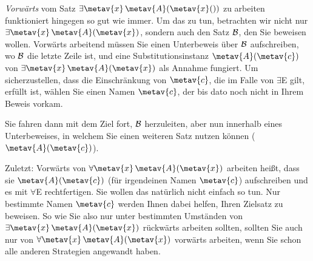 \emph{Vorwärts} vom Satz $\exists \metav{x}\, \atom{\metav{A}(\metav{x}})$ zu arbeiten funktioniert hingegen so gut wie immer. Um das zu tun, betrachten wir nicht nur $\exists \metav{x}\, \atom{\metav{A}}{\metav{x}}$, sondern auch den Satz $\mathcal{B}$, den Sie beweisen wollen. Vorwärts arbeitend müssen Sie einen Unterbeweis über $\mathcal{B}$ aufschreiben, wo $\mathcal{B}$ die letzte Zeile ist, und eine Substitutionsinstanz $\atom{\metav{A}}{\metav{c}}$ von $\exists \metav{x}\, \atom{\metav{A}}{\metav{x}}$ als Annahme fungiert. Um sicherzustellen, dass die Einschränkung von $\metav{c}$, die im Falle von $\exists$E gilt, erfüllt ist, wählen Sie einen Namen $\metav{c}$, der bis dato noch nicht in Ihrem Beweis vorkam. 
\begin{fitchproof}
	\ellipsesline
	\ellipsesline
	\open
	\ellipsesline
	\close
\end{fitchproof}
Sie fahren dann mit dem Ziel fort, $\mathcal{B}$ herzuleiten, aber nun innerhalb eines Unterbeweises, in welchem Sie einen weiteren Satz nutzen können ($\atom{\metav{A}}{\metav{c}}$).

Zuletzt: Vorwärts von $\forall \metav{x}\, \atom{\metav{A}}{\metav{x}}$ arbeiten hei{\ss}t, dass sie $\atom{\metav{A}}{\metav{c}}$ (für irgendeinen Namen $\metav{c}$) aufschreiben und es mit $\forall$E rechtfertigen. Sie wollen das natürlich nicht einfach so tun. Nur bestimmte Namen $\metav{c}$ werden Ihnen dabei helfen, Ihren Zielsatz zu beweisen. So wie Sie also nur unter bestimmten Umständen von $\exists \metav{x}\, \atom{\metav{A}}{\metav{x}}$ rückwärts arbeiten sollten, sollten Sie auch nur von $\forall \metav{x}\, \atom{\metav{A}}{\metav{x}}$ vorwärts arbeiten, wenn Sie schon alle anderen Strategien angewandt haben.

